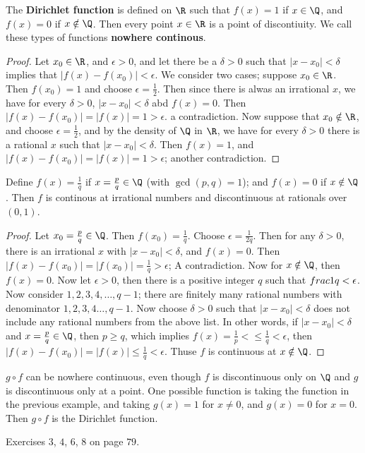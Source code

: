 \begin{example}
    The \textbf{Dirichlet function} is defined on $\R$ such that  $f(x)=1$ if  $x \in \Q$, and 
    $f(x)=0$ if  $x \notin \Q$. Then every point  $x \in \R$ is a point of discontiuity. We call these 
    types of functions \textbf{nowhere continous}.
\end{example} 
\begin{proof}
    Let  $x_0 \in \R$, and $\epsilon>0$, and let there be a  $\delta>0$ such that  $|x-x_0|<\delta$ 
    implies that $|f(x)-f(x_0)|<\epsilon$. We consider two cases; suppose  $x_0 \in \R$. Then 
    $f(x_0)=1$ and choose  $\epsilon=\frac{1}{2}$. Then since there is alwas an irrational $x$,
    we have for every  $\delta>0$,  $|x-x_0|<\delta$ abd  $f(x)=0$. Then  $|f(x)-f(x_0)|=|f(x)|=1>\epsilon$.
    a contradiction. Now suppose that $x_0 \notin \R$, and choose  $\epsilon=\frac{1}{2}$, and 
    by the density of $\Q$ in  $\R$, we have for every  $\delta>0$ there is a rational  $x$ 
    such that $|x-x_0|<\delta$. Then  $f(x)=1$, and  $|f(x)-f(x_0)|=|f(x)|=1>\epsilon$; another 
    contradiction.
\end{proof}

\begin{example}
    Define $f(x)=\frac{1}{q}$ if $x=\frac{p}{q} \in \Q$ (with $\gcd(p,q)=1$); and 
    $f(x)=0$ if  $x \notin \Q$. Then  $f$ is continous at irrational numbers and discontinuous at rationals over 
    $(0,1)$.
\end{example} 
\begin{proof}
    Let $x_0=\frac{p}{q} \in \Q$. Then $f(x_0)=\frac{1}{q}$. Choose $\epsilon=\frac{1}{2q}$. Then for
    any $\delta>0$, there is an irrational  $x$ with  $|x-x_0|<\delta$, and $f(x)=0$. Then 
    $|f(x)-f(x_0)|=|f(x_0)|=\frac{1}{q}>\epsilon$; A contradiction. Now for $x \notin \Q$, then 
    $f(x)=0$. Now let  $\epsilon>0$, then there is  a positive integer  $q$ such that 
    $\\frac{1}{q}<\epsilon$. Now consider $1,2,3,4, \dots, q-1$; there are finitely many 
    rational numbers with denominator $1,2,3,4 \dots, q-1$. Now choose  $\delta>0$ such that 
     $|x-x_0|<\delta$ does not include any rational numbers from the above list. In other 
     words, if $|x-x_0|<\delta$ and $x=\frac{p}{q} \in \Q$, then $p \geq q$, which implies 
     $f(x)= \frac{1}{p}< \leq \frac{1}{q}<\epsilon$, then $|f(x)-f(x_0)|=|f(x)| \leq \frac{1}{q}<\epsilon$. 
     Thuse $f$ is continuous at  $x \notin \Q$.
\end{proof}

\begin{remark} 
    $g \circ f$ can be nowhere continuous, even though  $f$ is discontinuous only on  $\Q$ and 
     $g$ is discontinuous only at a point. One possible function is taking the function in 
     the previous example, and taking $g(x)=1$ for  $x \neq 0$, and  $g(x)=0$ for  $x=0$. Then 
     $g \circ f$ is the Dirichlet function.
\end{remark}

\begin{HW} 
    Exercises $3$, $4$, $6$, $8$ on page $79$.
\end{HW}
